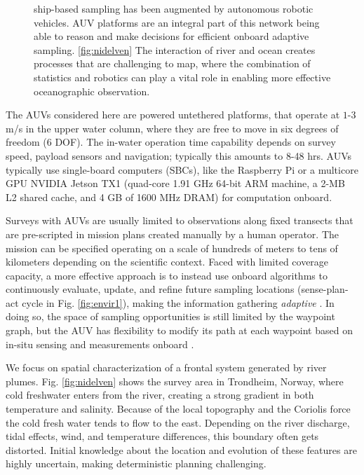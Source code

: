 \documentclass[aoas]{imsart}
\begin{document}
\begin{figure}[!h]
{    ship-based sampling has been augmented by autonomous
    robotic vehicles. %
    AUV platforms are an integral part of this network being able to
    reason and make decisions for efficient onboard adaptive sampling.
    \ref{fig:nidelven} The interaction of river and ocean creates
    processes that are challenging to map, where the combination of
    statistics and robotics can play a vital role in enabling more
    effective oceanographic observation.}
  \label{fig:envir} \end{figure}

The AUVs considered here are powered untethered platforms, that
operate at $1$-$3$ m/s in the upper water column, where they are free
to move in six degrees of freedom (6 DOF). The in-water operation time
capability depends on survey speed, payload sensors and navigation;
typically this amounts to 8-48 hrs. AUVs typically use single-board
computers (SBCs), like the Raspberry Pi or a multicore GPU NVIDIA
Jetson TX1 (quad-core 1.91 GHz 64-bit ARM machine, a 2-MB L2 shared
cache, and 4 GB of 1600 MHz DRAM) for computation onboard.

Surveys with AUVs are usually limited to observations along fixed
transects that are pre-scripted in mission plans created manually by a
human operator. The mission can be specified operating on a scale of
hundreds of meters to tens of kilometers depending on the scientific
context. Faced with limited coverage capacity, a more effective
approach is to instead use onboard algorithms to continuously
evaluate, update, and refine future sampling locations (sense-plan-act
cycle in Fig. \ref{fig:envir1}), making the information gathering
\emph{adaptive} \citep{das11b,Das2015,fossuminformation,fossum18b}.
In doing so, the space of sampling opportunities is still limited by
the waypoint graph, but the AUV has flexibility to modify its path at
each waypoint based on in-situ sensing and measurements onboard
\citep{py10,Rajan12,Rajan12b}.

We focus on spatial characterization of a frontal system generated by
river plumes. Fig. \ref{fig:nidelven} shows the survey area in
Trondheim, Norway, where cold freshwater enters from the river,
creating a strong gradient in both temperature and salinity. Because
of the local topography and the Coriolis force the cold fresh water
tends to flow to the east. Depending on the river discharge, tidal
effects, wind, and temperature differences, this boundary often gets
distorted. Initial knowledge about the location and evolution of these
features are highly uncertain, making deterministic planning
challenging.
\end{document}
